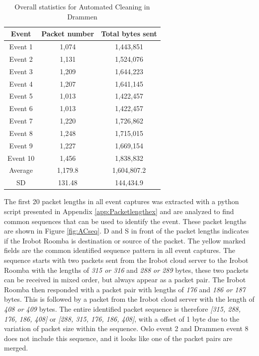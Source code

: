 \begin{table}[H]
\centering
\caption{Overall statistics for Automated Cleaning in Drammen}
\label{tab:ACoverallDRA}
\begin{tabular}{|c|c|c|}
\hline
\textbf{Event} & \textbf{Packet number} & \textbf{Total bytes sent} \\ \hline
Event 1        & 1,074                   & 1,443,851                   \\ \hline
Event 2        & 1,131                   & 1,524,076                   \\ \hline
Event 3        & 1,209                   & 1,644,223                   \\ \hline
Event 4        & 1,207                   & 1,641,145                   \\ \hline
Event 5        & 1,013                   & 1,422,457                   \\ \hline
Event 6        & 1,013                   & 1,422,457                   \\ \hline
Event 7        & 1,220                   & 1,726,862                   \\ \hline
Event 8        & 1,248                   & 1,715,015                   \\ \hline
Event 9        & 1,227                   & 1,669,154                   \\ \hline
Event 10       & 1,456                   & 1,838,832                   \\ \hline
Average        & 1,179.8                 & 1,604,807.2                 \\ \hline
SD        & 131.48
       & 144,434.9               \\ \hline
\end{tabular}
\end{table}

The first 20 packet lengths in all event captures was extracted with a python script presented in Appendix \ref{app:Packetlengthex} and are analyzed to find common sequences that can be used to identify the event. These packet lengths are shown in Figure \ref{fig:ACseq}. D and S in front of the packet lengths indicates if the Irobot Roomba is destination or source of the packet. The yellow marked fields are the common identified sequence pattern in all event captures. The sequence starts with two packets sent from the Irobot cloud server to the Irobot Roomba with the lengths of \textit{315 or 316} and \textit{288 or 289} bytes, these two packets can be received in mixed order, but always appear as a packet pair. The Irobot Roomba then responded with a packet pair with lengths of \textit{176} and \textit{186 or 187} bytes. This is followed by a packet from the Irobot cloud server with the length of \textit{408 or 409} bytes. The entire identified packet sequence is therefore \textit{[315, 288, 176, 186, 408]} or \textit{[288, 315, 176, 186, 408]}, with a offset of 1 byte due to the variation of packet size within the sequence. Oslo event 2 and Drammen event 8 does not include this sequence, and it looks like one of the packet pairs are merged. 

